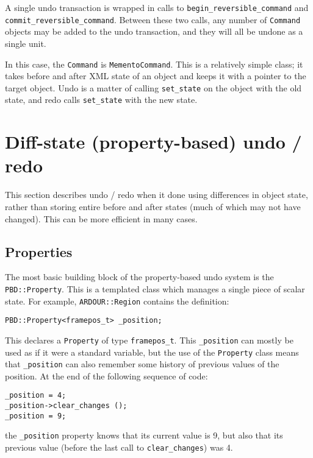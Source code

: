 \documentclass[10pt,a4paper]{book}
\newcommand{\code}[1]{\texttt{#1}}
\begin{document}
A single undo transaction is wrapped in calls to
\code{begin\_reversible\_command} and
\code{commit\_reversible\_command}.  Between these two calls, any
number of \code{Command} objects may be added to the undo transaction,
and they will all be undone as a single unit.

In this case, the \code{Command} is \code{MementoCommand}.  This is a
relatively simple class; it takes before and after XML state of an
object and keeps it with a pointer to the target object.  Undo is a
matter of calling \code{set\_state} on the object with the old state,
and redo calls \code{set\_state} with the new state.

\section{Diff-state (property-based) undo / redo}

This section describes undo / redo when it done using differences in
object state, rather than storing entire before and after states (much
of which may not have changed).  This can be more efficient in many
cases.


\subsection{Properties}

The most basic building block of the property-based undo system is the
\code{PBD::Property}.  This is a templated class which manages a
single piece of scalar state.  For example, \code{ARDOUR::Region}
contains the definition:

\begin{lstlisting}
PBD::Property<framepos_t> _position;
\end{lstlisting}

This declares a \code{Property} of type \code{framepos\_t}.  This
\code{\_position} can mostly be used as if it were a standard
variable, but the use of the \code{Property} class means that
\code{\_position} can also remember some history of previous values of
the position.  At the end of the following sequence of code:

\begin{lstlisting}
_position = 4;
_position->clear_changes ();
_position = 9;
\end{lstlisting}

the \code{\_position} property knows that its current value is 9, but
also that its previous value (before the last call to
\code{clear\_changes}) was 4.
\end{document}
